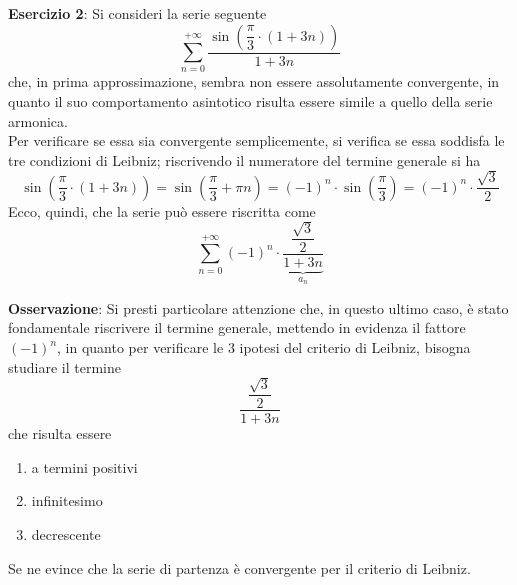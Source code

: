 \documentclass[a4paper]{extarticle}
\begin{document}
\vspace{2em}
\noindent
\textbf{Esercizio 2}: Si consideri la serie seguente
\[\sum_{n=0}^{+\infty} \dfrac{\sin \left(\dfrac{\pi}{3} \cdot (1+3n)\right)}{1+3n}\]
che, in prima approssimazione, sembra non essere assolutamente convergente, in quanto il suo comportamento asintotico risulta essere simile a quello della serie armonica.\\
Per verificare se essa sia convergente semplicemente, si verifica se essa soddisfa le tre condizioni di Leibniz; riscrivendo il numeratore del termine generale si ha
\[\sin \left(\dfrac{\pi}{3} \cdot (1+3n)\right) = \sin \left(\frac{\pi}{3} + \pi n\right) = (-1)^n \cdot \sin\left(\frac{\pi}{3}\right) = (-1)^n \cdot \frac{\sqrt{3}}{2}\]
Ecco, quindi, che la serie può essere riscritta come
\[\sum_{n=0}^{+\infty} (-1)^n \cdot \underbrace{\dfrac{\dfrac{\sqrt{3}}{2}}{1+3n}}_{a_n}\]

\vspace{1em}
\noindent
\textbf{Osservazione}: Si presti particolare attenzione che, in questo ultimo caso, è stato fondamentale riscrivere il termine generale, mettendo in evidenza il fattore $(-1)^n$, in quanto per verificare le $3$ ipotesi del criterio di Leibniz, bisogna studiare il termine
\[\dfrac{\dfrac{\sqrt{3}}{2}}{1+3n}\]
che risulta essere
\begin{enumerate}
    \item a termini positivi
    \item infinitesimo
    \item decrescente
\end{enumerate}
Se ne evince che la serie di partenza è convergente per il criterio di Leibniz.
\end{document}
